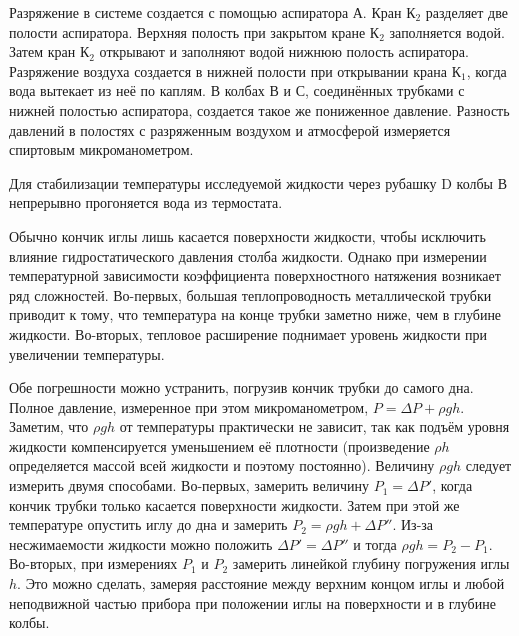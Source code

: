 Разряжение в системе создается с помощью аспиратора А. Кран К$_2$ разделяет две полости аспиратора. Верхняя полость при закрытом кране К$_2$ заполняется водой. Затем кран К$_2$ открывают и заполняют водой  нижнюю полость  аспиратора.  Разряжение воздуха создается в нижней полости  при открывании крана К$_1$, когда  вода вытекает из неё по каплям. В колбах В и С, соединённых трубками с нижней полостью аспиратора,  создается такое же пониженное давление. Разность давлений в полостях с разряженным воздухом и атмосферой измеряется спиртовым микроманометром.

Для стабилизации температуры исследуемой жидкости через рубашку D колбы В непрерывно прогоняется вода из термостата.

Обычно кончик иглы лишь касается поверхности жидкости, чтобы исключить влияние гидростатического давления столба жидкости. Однако при измерении температурной зависимости коэффициента поверхностного натяжения возникает ряд сложностей. Во-первых, большая теплопроводность металлической трубки приводит к тому, что температура на конце трубки заметно ниже, чем в глубине жидкости. Во-вторых, тепловое расширение поднимает уровень жидкости при увеличении температуры.

Обе погрешности можно устранить, погрузив кончик трубки до самого дна. Полное давление, измеренное при этом микроманометром, $P = \Delta P + \rho g h$. Заметим, что $\rho gh$ от температуры практически не зависит, так как подъём уровня жидкости компенсируется уменьшением её плотности (произведение $\rho h$ определяется массой всей жидкости и поэтому постоянно). Величину $\rho gh$ следует измерить двумя способами. Во-первых, замерить величину $P_1 = \Delta P'$, когда кончик трубки только касается поверхности жидкости. Затем при этой же температуре опустить иглу до дна и замерить $P_2 = \rho gh + \Delta P''$. Из-за  несжимаемости  жидкости можно положить $\Delta P' = \Delta P''$ и тогда $\rho gh = P_2 - P_1$. Во-вторых, при измерениях $P_1$ и $P_2$ замерить линейкой  глубину погружения иглы $h$. Это можно сделать, замеряя расстояние между верхним концом иглы и любой неподвижной частью прибора при положении иглы на поверхности и в глубине колбы.

